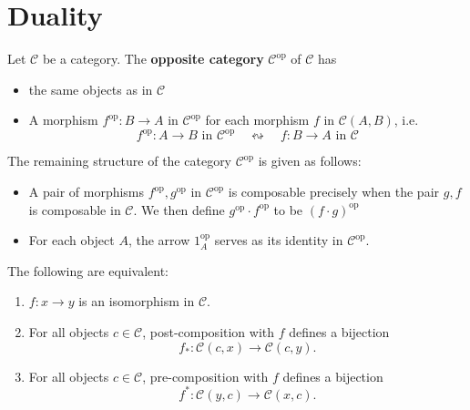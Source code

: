 \documentclass[12pt, oneside]{book}
\begin{document}
\section{Duality} %
\begin{definition}
    Let $\mathcal{C}$ be a category.
    The \textbf{opposite category} $\mathcal{C}^{\mathrm{op}}$ of $\mathcal{C}$ has
    \begin{itemize}
        \item
              the same objects as in $\mathcal{C}$

        \item
              A morphism $f^{\mathrm{op}}:B \rightarrow A$ in $\mathcal{C}^{\mathrm{op}}$ for each morphism $f$ in $\mathcal{C}\left(A,B\right)$, i.e.
              \begin{equation*}
                  f^{\mathrm{op}}: A \rightarrow B \text{ in } \mathcal{C}^{\mathrm{op}} \quad \leftrightsquigarrow
                  \quad f: B \rightarrow A \text{ in } \mathcal{C}
              \end{equation*}
    \end{itemize}
    The remaining structure of the category $\mathcal{C}^{\mathrm{op}}$ is given as
    follows:
    \begin{itemize}
        \item
              A pair of morphisms $f^{\mathrm{op}}, g^{\mathrm{op}}$ in $\mathcal{C}^{\mathrm{op}}$ is composable precisely when the pair $g, f$ is composable in $\mathcal{C}$.
              We then define $g^{\mathrm{op}} \cdot f^{\mathrm{op}}$ to be $(f \cdot g)^{\mathrm{op}}$
        \item
              For each object $A$, the arrow $1_A^{\mathrm{op}}$ serves as its identity in $\mathcal{C}^{\mathrm{op}}$.
    \end{itemize}
\end{definition}







\begin{lemma}
    The following are equivalent:
    \begin{enumerate}
        \item
              $f: x \rightarrow y$ is an isomorphism in $\mathcal{C}$.
        \item
              For all objects $c \in \mathcal{C}$, post-composition with $f$ defines a bijection
              \begin{equation*}
                  f_*: \mathcal{C}(c, x) \rightarrow \mathcal{C}(c, y) .
              \end{equation*}
        \item
              For all objects $c \in \mathcal{C}$, pre-composition with $f$ defines a bijection
              \begin{equation*}
                  f^*: \mathcal{C}(y, c) \rightarrow \mathcal{C}(x, c) .
              \end{equation*}
    \end{enumerate}
\end{lemma}
\end{document}
